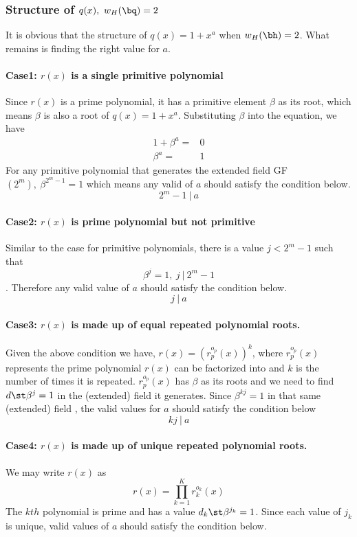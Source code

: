 \subsubsection{Structure of $q(x),~w_H(\bq) =2$ }
It is obvious that the structure of $q(x)=1+x^a$ when $w_H(\bh) =2$. What remains is finding the right value for $a$.
\paragraph{ Case1: $r(x)$ is a single primitive polynomial \newline }
Since $r(x)$ is a prime polynomial, it has a primitive element $\beta$ as its root, which means $\beta$ is also a root of $q(x)=1+x^a$. Substituting $\beta$ into the equation, we have 
\begin{equation}
\begin{split}
1+\beta^a=&0\\
\beta^a=&1
\end{split}
\end{equation}
For any primitive polynomial that generates the extended field GF$(2^m),~\beta^{2^{m}-1}=1$
which means any valid of $a$ should satisfy the condition below.
$$2^{m}-1~|~a$$

\paragraph{ Case2: $r(x)$ is prime polynomial but not primitive \newline}
Similar to the case for primitive polynomials, there is a value $j < 2^m-1$ such that 
$$\beta^j=1,~j~|~2^{m}-1 $$. Therefore any valid value of $a$ should satisfy the condition below.
$$j~|~a$$

\paragraph{ Case3: $r(x)$ is made up of equal repeated polynomial roots.\newline}
Given the above condition we have, $r(x)=(r^{o_p}_p(x))^k$, where $r^{o_p}_p(x)$ represents the prime polynomial $r(x)$ can be factorized into and $k$ is the number of times it is repeated. $r^{o_p}_p(x)$ has $\beta$ as its roots and we need to find $d \st \beta^j=1$ in the (extended) field it generates. Since $\beta^{kj}=1$ in that same (extended) field , the valid values for $a$ should satisfy the condition below
$$kj ~| ~a$$

\paragraph{Case4: $r(x)$ is made up of unique repeated polynomial roots. \newline}
We may write $r(x)$ as $$r(x)=\prod_{k=1}^{K}r^{o_k}_k(x)$$ The $kth$ polynomial is prime and has a value $d_k \st \beta^{j_k}=1$. Since each value of $j_k$ is unique, valid values of $a$ should satisfy the condition below. 

